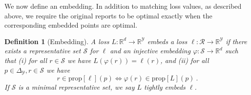 \documentclass[11pt]{article}
\newcommand{\reals}{\mathbb{R}}
\newcommand{\prop}[1]{\mathrm{prop}[#1]}
\newcommand{\simplex}{\Delta_\Y}
\newcommand{\R}{\mathcal{R}}
\newcommand{\Sc}{\mathcal{S}}
\newcommand{\Y}{\mathcal{Y}}
\newcommand{\inprod}[2]{\langle #1, #2 \rangle}%
\DeclareMathOperator*{\argmin}{arg\,min}
\newtheorem{definition}{Definition}
\begin{document}
We now define an embedding.
In addition to matching loss values, as described above, we require the original reports to be optimal exactly when the corresponding embedded points are optimal.
\begin{definition}[Embedding]\label{def:loss-embed}
  A loss $L:\reals^d\to\reals^\Y$ \emph{embeds} a loss $\ell:\R\to\reals^\Y$ if there exists a representative set $\Sc$ for $\ell$ and an injective embedding $\varphi:\Sc\to\reals^d$ such that
  (i) for all $r\in\Sc$ we have $L(\varphi(r)) = \ell(r)$, and (ii) for all $p\in\simplex,r\in\Sc$ we have
  \begin{equation}\label{eq:embed-loss}
    r \in \prop{\ell}(p) \iff \varphi(r) \in \prop{L}(p)~.
  \end{equation}
  If $\Sc$ is a minimal representative set, we say $L$ \emph{tightly embeds} $\ell$.
\end{definition}
\end{document}
